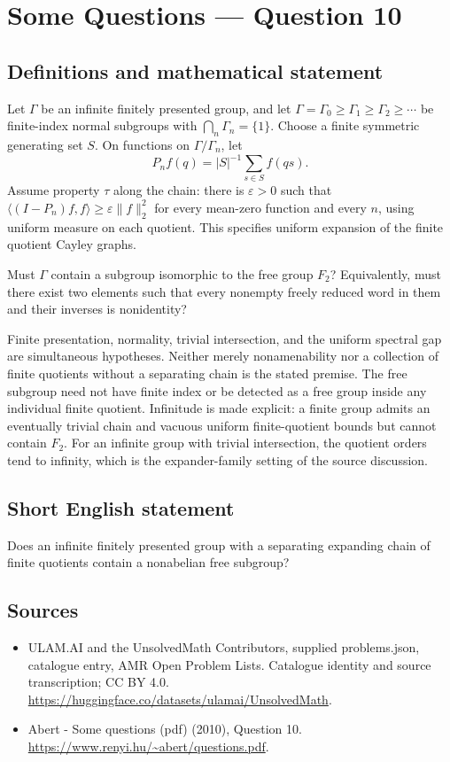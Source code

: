 \documentclass[11pt,a4paper]{article}
\begin{document}
\section*{Some Questions — Question 10}\label{statement}

\subsection{Definitions and mathematical statement}
Let $\Gamma$ be an infinite finitely presented group, and let
$\Gamma=\Gamma_0\geq\Gamma_1\geq\Gamma_2\geq\cdots$ be finite-index normal subgroups with $\bigcap_n\Gamma_n=\{1\}$. Choose a finite symmetric generating set $S$. On functions on $\Gamma/\Gamma_n$, let
\[
 P_n f(q)=|S|^{-1}\sum_{s\in S}f(qs).
\]
Assume property $\tau$ along the chain: there is $\varepsilon>0$ such that $\langle(I-P_n)f,f\rangle\geq\varepsilon\|f\|_2^2$ for every mean-zero function and every $n$, using uniform measure on each quotient. This specifies uniform expansion of the finite quotient Cayley graphs.

Must $\Gamma$ contain a subgroup isomorphic to the free group $F_2$? Equivalently, must there exist two elements such that every nonempty freely reduced word in them and their inverses is nonidentity?

Finite presentation, normality, trivial intersection, and the uniform spectral gap are simultaneous hypotheses. Neither merely nonamenability nor a collection of finite quotients without a separating chain is the stated premise. The free subgroup need not have finite index or be detected as a free group inside any individual finite quotient. Infinitude is made explicit: a finite group admits an eventually trivial chain and vacuous uniform finite-quotient bounds but cannot contain $F_2$. For an infinite group with trivial intersection, the quotient orders tend to infinity, which is the expander-family setting of the source discussion.
\subsection{Short English statement}
Does an infinite finitely presented group with a separating expanding chain of finite quotients contain a nonabelian free subgroup?
\subsection{Sources}
\begin{itemize}
\item[S1] ULAM.AI and the UnsolvedMath Contributors, supplied problems.json, catalogue entry, AMR Open Problem Lists. Catalogue identity and source transcription; CC BY 4.0.
\url{https://huggingface.co/datasets/ulamai/UnsolvedMath}.
\item[S2] Abert - Some questions (pdf) (2010), Question 10. 
\url{https://www.renyi.hu/~abert/questions.pdf}.
\end{itemize}
\end{document}

